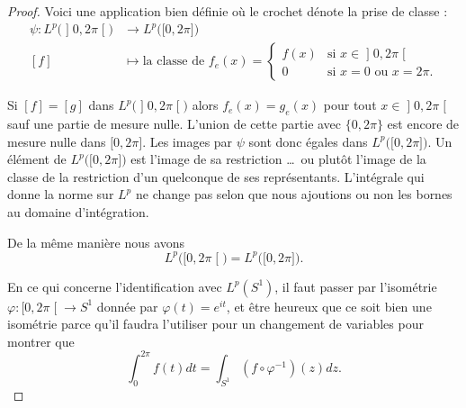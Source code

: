 \begin{proof}
	Voici une application bien définie où le crochet dénote la prise de classe :
	\begin{equation}
		\begin{aligned}
			\psi\colon L^p\big(\mathopen] 0 , 2\pi \mathclose[\big) & \to L^p\big(\mathopen[ 0 , 2\pi \mathclose]\big)               \\
			[f]                                                     & \mapsto \text{la classe de } f_e(x)=\begin{cases}
				f(x) & \text{si } x\in\mathopen] 0 , 2\pi \mathclose[ \\
				0    & \text{si } x=0\text{ ou } x=2\pi.
			\end{cases}
		\end{aligned}
	\end{equation}
	\begin{subproof}
		\spitem[Injective]
		Si \( [f]=[g]\) dans \( L^p\big(\mathopen] 0 , 2\pi \mathclose[\big)\) alors \( f_e(x)=g_e(x)\) pour tout \( x\in \mathopen] 0 , 2\pi \mathclose[ \) sauf une partie de mesure nulle. L'union de cette partie avec \( \{ 0,2\pi \}\) est encore de mesure nulle dans \( \mathopen[ 0 , 2\pi \mathclose]\). Les images par \( \psi\) sont donc égales dans \( L^p\big( \mathopen[ 0 , 2\pi \mathclose] \big)\).
		\spitem[Surjective]
		Un élément de \( L^p\big( \mathopen[ 0 , 2\pi \mathclose] \big)\) est l'image de sa restriction \ldots\ ou plutôt l'image de la classe de la restriction d'un quelconque de ses représentants.
		\spitem[Isométrie]
		L'intégrale qui donne la norme sur \( L^p\) ne change pas selon que nous ajoutions ou non les bornes au domaine d'intégration.
	\end{subproof}

	De la même manière nous avons
	\begin{equation}
		L^p\big( \mathopen[ 0 , 2\pi \mathclose[ \big)=L^p\big( \mathopen[ 0 , 2\pi \mathclose] \big).
	\end{equation}

	En ce qui concerne l'identification avec \( L^p(S^1)\), il faut passer par l'isométrie \( \varphi\colon \mathopen[ 0 , 2\pi \mathclose[\to S^1\) donnée par \( \varphi(t)= e^{it}\), et être heureux que ce soit bien une isométrie parce qu'il faudra l'utiliser pour un changement de variables pour montrer que
	\begin{equation}
		\int_0^{2\pi}f(t)dt=\int_{S^1}(f\circ\varphi^{-1})(z)dz.
	\end{equation}
\end{proof}

